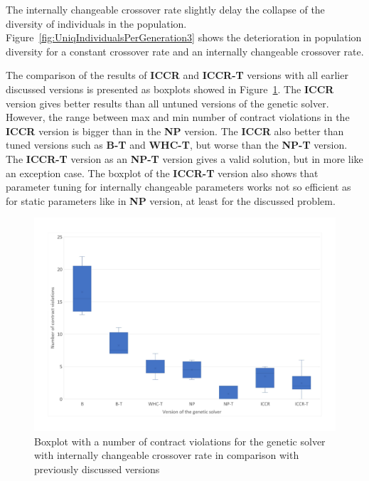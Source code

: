 The internally changeable crossover rate slightly delay the collapse of the diversity of individuals in the population. Figure~\ref{fig:UniqIndividualsPerGeneration3} shows the deterioration in population diversity for a constant crossover rate and an internally changeable crossover rate.


The comparison of the results of \textbf{ICCR} and \textbf{ICCR-T} versions with all earlier discussed versions is presented as boxplots showed in Figure~\ref{fig:boxplotsolverAdaptiveCrossoverTuning}. The \textbf{ICCR} version gives better results than all untuned versions of the genetic solver. However, the range between max and min number of contract violations in the \textbf{ICCR} version is bigger than in the \textbf{NP} version.
The \textbf{ICCR} also better than tuned versions such as \textbf{B-T} and \textbf{WHC-T}, but worse than the \textbf{NP-T} version. The \textbf{ICCR-T} version as an \textbf{NP-T} version gives a valid solution, but in more like an exception case. The boxplot of the \textbf{ICCR-T} version also shows that parameter tuning for internally changeable parameters works not so efficient as for static parameters like in \textbf{NP} version, at least for the discussed problem. 

\begin{figure}
	\centering
	\includegraphics[width=\textwidth]{images/BoxPlotSolverAdaptiveCrossoverTuning.pdf}
	\caption[Boxplot with a number of contract violations for the genetic solver with internally changeable crossover rate in comparison with previously discussed versions]{Boxplot with a number of contract violations for the genetic solver with internally changeable crossover rate in comparison with previously discussed versions}
	\label{fig:boxplotsolverAdaptiveCrossoverTuning}
\end{figure}


